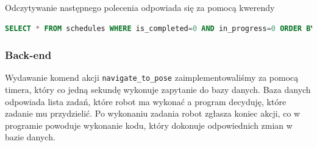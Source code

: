 \documentclass[12pt]{article}
\newcommand{\vsp}{\vspace{0.5cm}}
\begin{document}
\vsp
\vsp

\noindent Odczytywanie następnego polecenia odpowiada się za pomocą kwerendy

\vsp 

\begin{lstlisting}[language=SQL]
SELECT * FROM schedules WHERE is_completed=0 AND in_progress=0 ORDER BY timestamp
\end{lstlisting}



\newpage
\subsubsection*{Back-end}

Wydawanie komend akcji \texttt{navigate\_to\_pose} zaimplementowaliśmy za pomocą timera, który co jedną sekundę wykonuje zapytanie do bazy danych. Baza danych odpowiada lista zadań, które robot ma wykonać a program decyduję, które zadanie mu przydzielić. Po wykonaniu zadania robot zgłasza koniec akcji, co w programie powoduje wykonanie kodu, który dokonuje odpowiednich zmian w bazie danych.

\vsp
\end{document}
